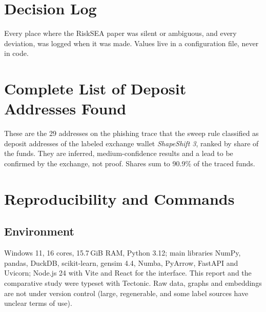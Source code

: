 \appendix
\renewcommand{\chaptername}{Appendix}
\chapter{Decision Log}
\label{app:decisions}
Every place where the RiskSEA paper was silent or ambiguous, and every deviation, was logged when it was made. Values live in a configuration file, never in code.
{\footnotesize\singlespacing

}

\chapter{Complete List of Deposit Addresses Found}
\label{app:deposits}
These are the 29 addresses on the phishing trace that the sweep rule classified as deposit addresses of the labeled exchange wallet \emph{ShapeShift 3}, ranked by share of the funds. They are inferred, medium-confidence results and a lead to be confirmed by the exchange, not proof. Shares sum to 90.9\% of the traced funds.

\chapter{Reproducibility and Commands}
\label{app:repro}
\section{Environment}
Windows 11, 16 cores, 15.7\,GiB RAM, Python 3.12; main libraries NumPy, pandas, DuckDB, scikit-learn, gensim 4.4, Numba, PyArrow, FastAPI and Uvicorn; Node.js 24 with Vite and React for the interface. This report and the comparative study were typeset with Tectonic. Raw data, graphs and embeddings are not under version control (large, regenerable, and some label sources have unclear terms of use).

